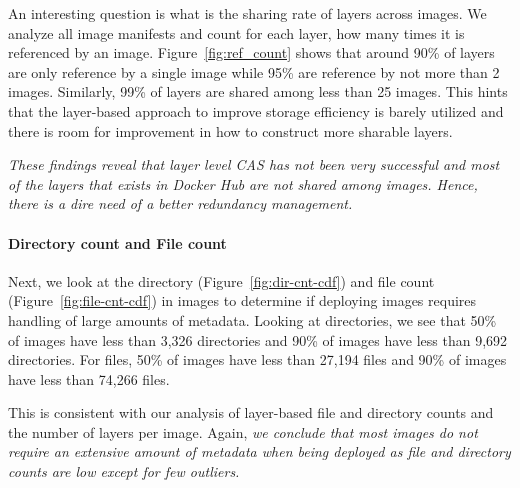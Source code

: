 An interesting question is what is the sharing rate of layers across images.
We analyze all image manifests and count for each layer, how many times it is
referenced by an image. Figure~\ref{fig:ref_count} shows that around 90\% of
layers are only reference by a single image while 95\% are reference by not
more than 2 images. Similarly, 99\% of layers are shared among less than 25
images. 
This hints that the
layer-based approach to improve storage efficiency is barely utilized and there
is room for improvement in how to construct more sharable layers.

\emph{These findings reveal that layer level CAS has not been very successful
	and most of the layers that exists in Docker Hub are not shared among images.
	Hence, there is a dire need of a better redundancy management.}


\paragraph{Directory count and File count}

Next, we look at the directory (Figure~\ref{fig:dir-cnt-cdf}) and file count
(Figure~\ref{fig:file-cnt-cdf}) in images to determine if deploying images requires
handling of large amounts of metadata. 
Looking at directories, we see that 50\% of images have less than 3,326 directories and 90\% of images have less than
9,692 directories. %
For
files, 50\% of images have less than 27,194 files and 90\% of images have less than 74,266 files.

This is consistent with our analysis of layer-based file and directory counts
and the number of layers per image. Again, \textit{we conclude that most images do not
require an extensive amount of metadata when being deployed as file and
directory counts are low except for few outliers.}


%

